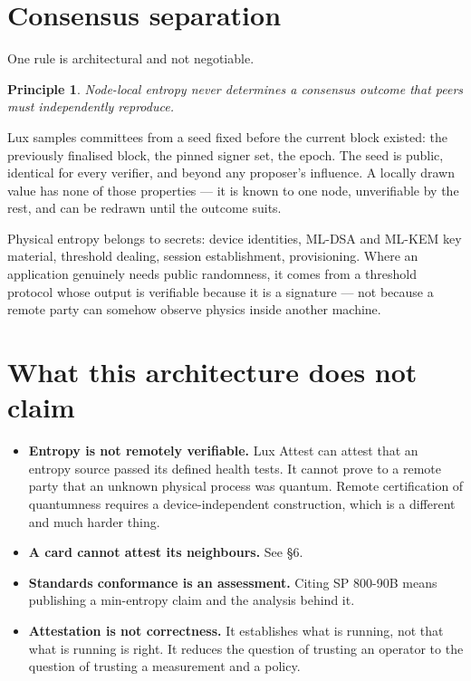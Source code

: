 \documentclass[11pt,a4paper]{article}
\newtheorem{principle}{Principle}
\begin{document}
\section{Consensus separation}\label{sec:consensus}

One rule is architectural and not negotiable.

\begin{principle}
Node-local entropy never determines a consensus outcome that peers must
independently reproduce.
\end{principle}

Lux samples committees from a seed fixed before the current block existed: the
previously finalised block, the pinned signer set, the epoch. The seed is
public, identical for every verifier, and beyond any proposer's influence. A
locally drawn value has none of those properties --- it is known to one node,
unverifiable by the rest, and can be redrawn until the outcome suits.

Physical entropy belongs to secrets: device identities, ML-DSA and ML-KEM key
material, threshold dealing, session establishment, provisioning. Where an
application genuinely needs public randomness, it comes from a threshold
protocol whose output is verifiable because it is a signature --- not because a
remote party can somehow observe physics inside another machine.

\section{What this architecture does not claim}

\begin{itemize}
\item \textbf{Entropy is not remotely verifiable.} Lux Attest can attest that
an entropy source passed its defined health tests. It cannot prove to a remote
party that an unknown physical process was quantum. Remote certification of
quantumness requires a device-independent construction, which is a different
and much harder thing.
\item \textbf{A card cannot attest its neighbours.} See \S6.
\item \textbf{Standards conformance is an assessment.} Citing SP 800-90B means
publishing a min-entropy claim and the analysis behind it.
\item \textbf{Attestation is not correctness.} It establishes what is running,
not that what is running is right. It reduces the question of trusting an
operator to the question of trusting a measurement and a policy.
\end{itemize}
\end{document}
